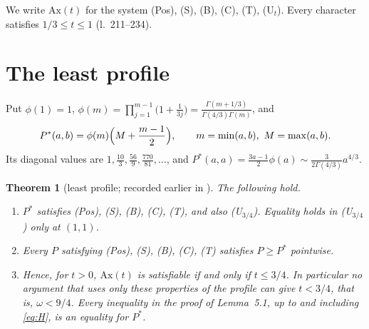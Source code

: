 \documentclass[11pt]{amsart}
\newtheorem{theorem}{Theorem}
\theoremstyle{remark}
\begin{document}
We write $\mathrm{Ax}(t)$ for the system (Pos), (S), (B), (C), (T), (U$_t$).
Every character satisfies $1/3\le t\le 1$ (l.~211--234).

\section{The least profile}

Put $\phi(1)=1$, $\phi(m)=\prod_{j=1}^{m-1}\bigl(1+\frac1{3j}\bigr)
=\frac{\Gamma(m+1/3)}{\Gamma(4/3)\Gamma(m)}$, and
\[
P^*(a,b)=\phi(m)\Bigl(M+\frac{m-1}{2}\Bigr),\qquad m=\min(a,b),\ M=\max(a,b).
\]
Its diagonal values are $1,\frac{10}3,\frac{56}9,\frac{770}{81},\dots$, and
$P^*(a,a)=\frac{3a-1}{2}\phi(a)\sim\frac{3}{2\Gamma(4/3)}a^{4/3}$.

\begin{theorem}[least profile; recorded earlier in \cite{EC}]\label{thm:main}
The following hold.
\begin{enumerate}
\item[(i)] $P^*$ satisfies (Pos), (S), (B), (C), (T), and also (U$_{3/4}$).
Equality holds in (U$_{3/4}$) only at $(1,1)$.
\item[(ii)] Every $P$ satisfying (Pos), (S), (B), (C), (T) satisfies
$P\ge P^*$ pointwise.
\item[(iii)] Hence, for $t>0$, $\mathrm{Ax}(t)$ is satisfiable if and only if $t\le 3/4$.
In particular no argument that uses only these properties of the profile can
give $t<3/4$, that is, $\omega<9/4$. Every inequality in the proof of
Lemma~5.1, up to and including \eqref{eq:H}, is an equality for $P^*$.
\end{enumerate}
\end{theorem}
\end{document}
